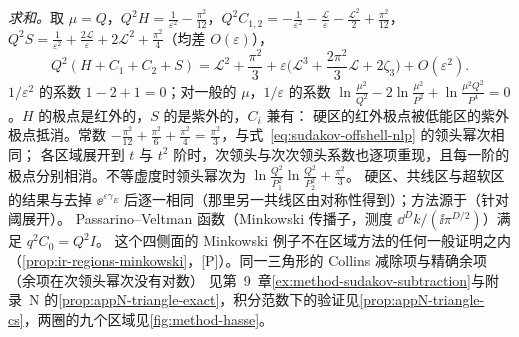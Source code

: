 \begin{example}
\emph{求和。}取 $\mu=Q$，$Q^2H=\frac1{\varepsilon^2}-\frac{\pi^2}{12}$，$Q^2C_{1,2}=-\frac1{\varepsilon^2}-\frac{\mathcal L}\varepsilon-\frac{\mathcal L^2}2+\frac{\pi^2}{12}$，
$Q^2S=\frac1{\varepsilon^2}+\frac{2\mathcal L}\varepsilon+2\mathcal L^2+\frac{\pi^2}4$（均差 $O(\varepsilon)$），
\begin{equation}\label{eq:sudakov-regions-sum}
Q^2(H+C_1+C_2+S)=\mathcal L^2+\frac{\pi^2}3+\varepsilon\Big(\mathcal L^3+\frac{2\pi^2}3\mathcal L+2\zeta_3\Big)+O(\varepsilon^2).
\end{equation}
$1/\varepsilon^2$ 的系数 $1-2+1=0$；对一般的 $\mu$，$1/\varepsilon$ 的系数 $\ln\frac{\mu^2}{Q^2}-2\ln\frac{\mu^2}{P^2}+\ln\frac{\mu^2Q^2}{P^4}=0$。$H$ 的极点是红外的，$S$ 的是紫外的，$C_i$ 兼有：
硬区的红外极点被低能区的紫外极点抵消。常数 $-\frac{\pi^2}{12}+\frac{\pi^2}6+\frac{\pi^2}4=\frac{\pi^2}3$，与式~\eqref{eq:sudakov-offshell-nlp} 的领头幂次相同；
各区域展开到 $t$ 与 $t^2$ 阶时，次领头与次次领头系数也逐项重现，且每一阶的极点分别相消。不等虚度时领头幂次为 $\ln\frac{Q^2}{P_1^2}\ln\frac{Q^2}{P_2^2}+\frac{\pi^2}3$。%
硬区、共线区与超软区的结果与\cite[第~2.2~节，式~(2.39)--(2.44)]{BecherBroggioFerroglia2015}去掉 $\ee^{\varepsilon\gamma_E}$ 后逐一相同（那里另一共线区由对称性得到）；方法源于\cite{BenekeSmirnov1998}（针对阈展开）。
Passarino--Veltman 函数（Minkowski 传播子，测度 $\dd^Dk/(\ii\pi^{D/2})$）满足 $q^2C_0=Q^2I$。%
这个四侧面的 Minkowski 例子不在区域方法的任何一般证明之内（\cref{prop:ir-regions-minkowski}，[P]）。同一三角形的 Collins 减除项与精确余项（余项在次领头幂次没有对数）
见第~9~章\cref{ex:method-sudakov-subtraction}与附录~N 的\cref{prop:appN-triangle-exact}，积分范数下的验证见\cref{prop:appN-triangle-cs}，两圈的九个区域见\cref{fig:method-hasse}。
\end{example}

